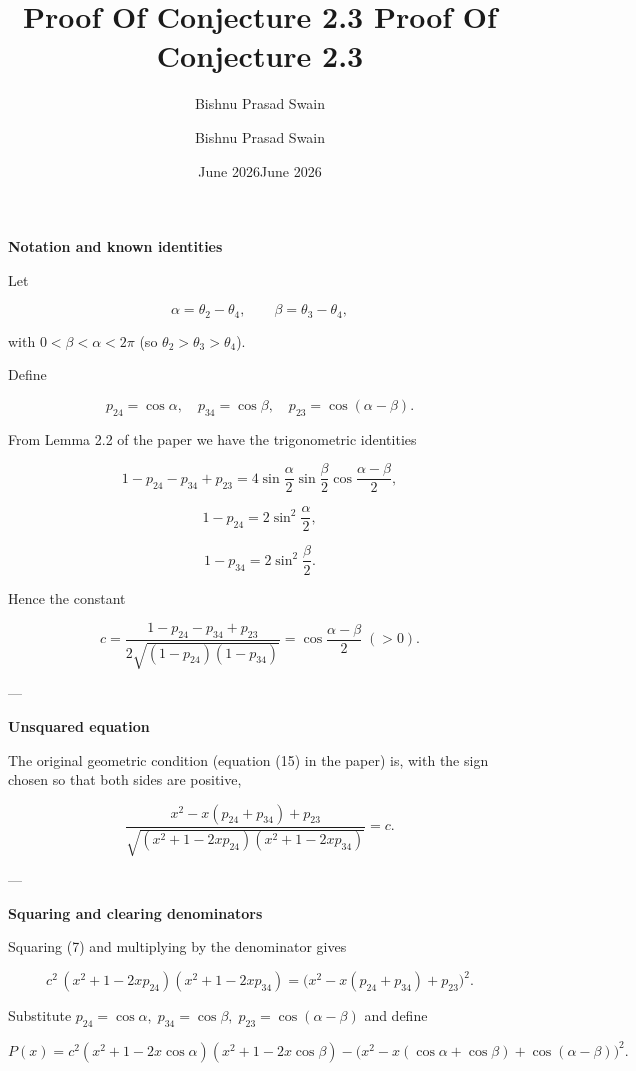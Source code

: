 \documentclass{article}
\title{Proof Of Conjecture 2.3 }
\author{Bishnu Prasad Swain}
\date{June 2026}
\begin{document}
\title{Proof Of Conjecture 2.3 }
\author{Bishnu Prasad Swain}
\date{June 2026}
\maketitle

\noindent\textbf{Notation and known identities}

Let  

\[
\alpha = \theta_2 - \theta_4, \qquad \beta = \theta_3 - \theta_4, \tag{1}
\]  

with \(0<\beta<\alpha<2\pi\) (so \(\theta_2 > \theta_3 > \theta_4\)).  

Define  

\[
p_{24} = \cos\alpha,\quad p_{34} = \cos\beta,\quad p_{23} = \cos(\alpha-\beta). \tag{2}
\]  

From Lemma 2.2 of the paper we have the trigonometric identities  

\[
1-p_{24}-p_{34}+p_{23} = 4\sin\frac{\alpha}{2}\sin\frac{\beta}{2}\cos\frac{\alpha-\beta}{2}, \tag{3}
\]  

\[
1-p_{24} = 2\sin^{2}\frac{\alpha}{2}, \tag{4}
\]  

\[
1-p_{34} = 2\sin^{2}\frac{\beta}{2}. \tag{5}
\]  

Hence the constant  

\[
c = \frac{1-p_{24}-p_{34}+p_{23}}{2\sqrt{(1-p_{24})(1-p_{34})}} = \cos\frac{\alpha-\beta}{2} \; (>0). \tag{6}
\]  

---

\noindent\textbf{Unsquared equation}  

The original geometric condition (equation (15) in the paper) is, with the sign chosen so that both sides are positive,  

\[
\frac{x^{2}-x(p_{24}+p_{34})+p_{23}}{\sqrt{(x^{2}+1-2xp_{24})(x^{2}+1-2xp_{34})}} = c. \tag{7}
\]  

---

\noindent\textbf{Squaring and clearing denominators}  

Squaring (7) and multiplying by the denominator gives  

\[
c^{2}\,(x^{2}+1-2xp_{24})(x^{2}+1-2xp_{34}) = \bigl(x^{2}-x(p_{24}+p_{34})+p_{23}\bigr)^{2}. \tag{8}
\]  

Substitute \(p_{24}=\cos\alpha,\; p_{34}=\cos\beta,\; p_{23}=\cos(\alpha-\beta)\) and define  

\[
P(x)=c^{2}(x^{2}+1-2x\cos\alpha)(x^{2}+1-2x\cos\beta)-\bigl(x^{2}-x(\cos\alpha+\cos\beta)+\cos(\alpha-\beta)\bigr)^{2}. \tag{9}
\]  
\end{document}
